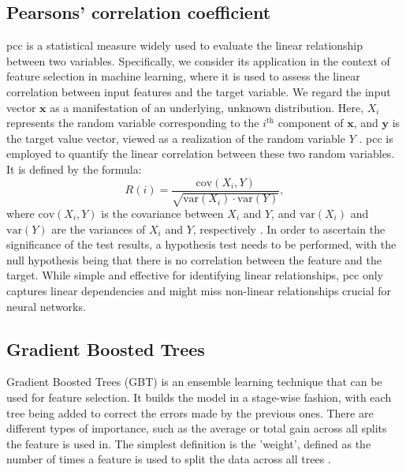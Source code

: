 \documentclass[12pt, a4paper, headinclude, twoside, plainheadsepline, open=right, numbers=noenddot, hidelinks, toc=listof, toc=bibliography]{scrreprt}
\begin{document}
\subsection{Pearsons' correlation coefficient}
\label{ssec:pearsons}
\Ac{pcc} is a statistical measure widely used to evaluate the linear relationship between two variables. 
Specifically, we consider its application in the context of feature selection in machine learning, where it is used to assess the linear correlation between input features and the target variable. 
We regard the input vector $\mathbf{x}$ as a manifestation of an underlying, unknown distribution. 
Here, $X_i$ represents the random variable corresponding to the $i^{\text{th}}$ component of $\mathbf{x}$, and $\mathbf{y}$ is the target value vector, viewed as a realization of the random variable $Y$ \cite{guyonIntroductionVariableFeature}. 
\Ac{pcc} is employed to quantify the linear correlation between these two random variables. It is defined by the formula:
\begin{equation}
R(i) = \frac{\text{cov}(X_i, Y)}{\sqrt{\text{var}(X_i) \cdot \text{var}(Y)}},
\end{equation}
where $\text{cov}(X_i, Y)$ is the covariance between $X_i$ and $Y$, and $\text{var}(X_i)$ and $\text{var}(Y)$ are the variances of $X_i$ and $Y$, respectively \cite{chandrashekarSurveyFeatureSelection2014}.
In order to ascertain the significance of the test results, a hypothesis test needs to be performed, with the null hypothesis being that there is no correlation between the feature and the target.
While simple and effective for identifying linear relationships, \ac{pcc} only captures linear dependencies and might miss non-linear relationships crucial for neural networks.


\subsection{Gradient Boosted Trees}
\label{ssec:gbt}

Gradient Boosted Trees (GBT) is an ensemble learning technique that can be used for feature selection. It builds the model in a stage-wise fashion, with each tree being added to correct the errors made by the previous ones. 
There are different types of importance, such as the average or total gain across all splits the feature is used in.
The simplest definition is the 'weight', defined as the number of times a feature is used to split the data across all trees \cite{chenXGBoostScalableTree2016}.
\end{document}
